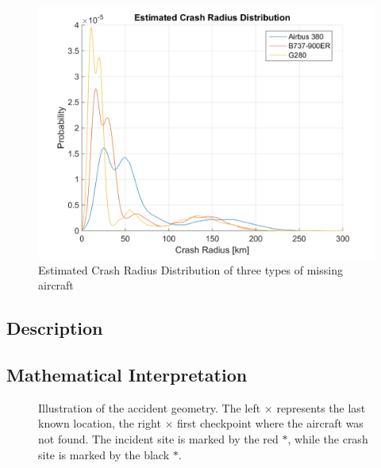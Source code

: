 \documentclass[12pt, letterpaper]{article}  %
\theoremstyle{definition}
\theoremstyle{remark}
\theoremstyle{plain}
\begin{document}
\begin{center}
	\begin{figure}[H]
		\includegraphics[width=0.9\linewidth]{simulation/CrashRadiusExplain.png}
		\caption{Estimated Crash Radius Distribution of three types of missing aircraft}
		\label{fig:CrashRadius}
	\end{figure}
\end{center}


\subsection{Description}\label{subsecmeth:desc}



\subsection{Mathematical Interpretation}\label{subsecDist:math}



\begin{center}
	\begin{figure}[H]
		\centering
		\caption{Illustration of the accident geometry. The left {\large $\times$} represents the last known location, the right {\large $\times$} first checkpoint where the aircraft was not found. The incident site is marked by the red {\huge $\ast$}, while the crash site is marked by the black {\huge $\ast$}.}
		\label{fig:CrashRadius}
	\end{figure}
\end{center}
\end{document}
